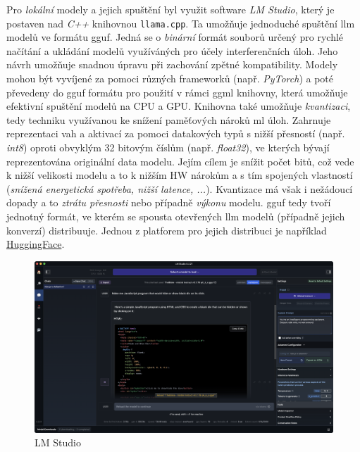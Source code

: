 \documentclass[czech, ma, kiv, he, iso690numb, pdf, viewonly]{fasthesis}
\begin{document}
            Pro \emph{lokální} modely a jejich spuštění byl využit software \textit{LM Studio}, který je postaven nad \textit{C++} knihovnou \verb|llama.cpp|. Ta umožňuje jednoduché spuštění \Gls{llm} modelů ve formátu \acrfull{gguf}. Jedná se o \textit{binární} formát souborů určený pro rychlé načítání a ukládání modelů využíváných pro účely interferenčních úloh. Jeho návrh umožňuje snadnou úpravu při zachování zpětné kompatibility. \cite{ggerganov_gguf} \cite{huggingface_gguf} Modely mohou být vyvíjené za pomoci různých frameworků (např. \textit{PyTorch}) a poté převedeny do \acrshort{gguf} formátu pro použití v rámci \acrshort{ggml} knihovny, která umožňuje efektivní spuštění modelů na CPU a GPU. Knihovna také umožňuje \emph{kvantizaci}, tedy techniku využívanou ke snížení paměťových nároků \acrshort{ml} úloh. Zahrnuje reprezentaci vah a aktivací za pomoci datakových typů s nižší přesností (např. \textit{int8}) oproti obvyklým 32 bitovým číslům (např. \textit{float32}), ve kterých bývají reprezentována originální data modelu. Jejím cílem je snížit počet bitů, což vede k nižší velikosti modelu a to k nižším HW nárokům a s tím spojených vlastností (\textit{snížená energetická spotřeba, nižší latence, ...}). Kvantizace má však i nežádoucí dopady a to \textit{ztrátu přesnosti} nebo případně \textit{výkonu} modelu. \cite{huggingface_quantization} \Acrshort{gguf} tedy tvoří jednotný formát, ve kterém se spousta otevřených \Gls{llm} modelů (případně jejich konverzí) distribuuje. Jednou z platforem pro jejich distribuci je například \href{https://huggingface.co}{HuggingFace}.

            \begin{figure}
                \includegraphics[width=\textwidth]{pic/lm_studio.png}
                \centering
                \caption{LM Studio}
                \label{fig:lm_studio}
            \end{figure}
\end{document}
